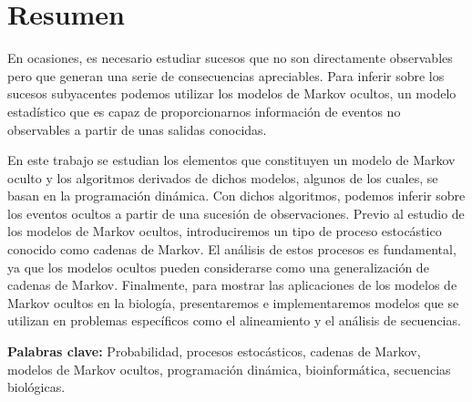 \chapter*{Resumen}
En ocasiones, es necesario estudiar sucesos que no son directamente observables pero que generan una serie de consecuencias apreciables. Para inferir sobre los sucesos subyacentes podemos utilizar los modelos de Markov ocultos, un modelo estadístico que es capaz de proporcionarnos información de eventos no observables a partir de unas salidas conocidas. 

En este trabajo se estudian los elementos que constituyen un modelo de Markov oculto y los algoritmos derivados de dichos modelos, algunos de los cuales, se basan en la  programación dinámica. Con dichos algoritmos, podemos inferir sobre los eventos ocultos a partir de una sucesión de observaciones. Previo al estudio de los modelos de Markov ocultos, introduciremos un tipo de proceso estocástico conocido como cadenas de Markov. El análisis de estos procesos es fundamental, ya que los modelos ocultos pueden considerarse como una generalización de cadenas de Markov. Finalmente, para mostrar las aplicaciones de los modelos de Markov ocultos en la biología, presentaremos e implementaremos modelos que se utilizan en problemas específicos como el alineamiento y el análisis de secuencias.

\textbf{Palabras clave:} Probabilidad, procesos estocásticos, cadenas de Markov, modelos de Markov ocultos, programación dinámica, bioinformática, secuencias biológicas.